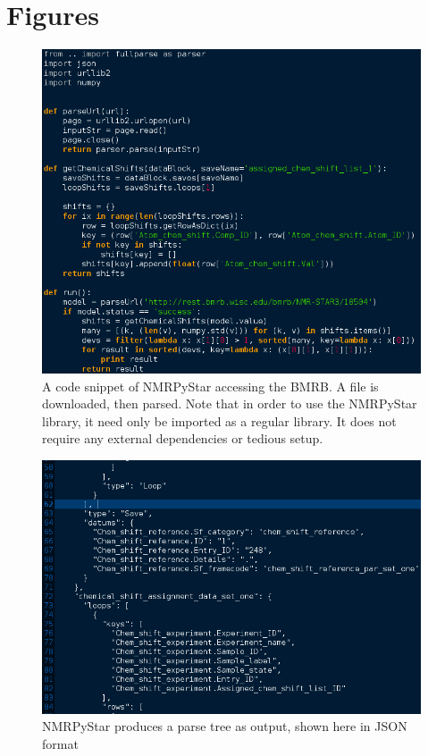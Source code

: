 \section{Figures}

\begin{figure}[h]
  \includegraphics[scale=0.5]{figures/nmrpystar_bmrb}
  \caption[A code snippet of NMRPyStar.]
          {A code snippet of NMRPyStar accessing the BMRB.
           A file is downloaded, then parsed.  Note that in order to use
           the NMRPyStar library, it need only be imported as a regular
           library.  It does not require any external dependencies or
           tedious setup.}
  \label{nmrpystar_bmrb}
\end{figure}

\begin{figure}
  \includegraphics[scale=0.5]{figures/nmrpystar_json}
  \caption[NMRPyStar produces a parse tree as output.]
          {NMRPyStar produces a parse tree as output, shown here in JSON format}
  \label{nmrpystar_json}
\end{figure}

